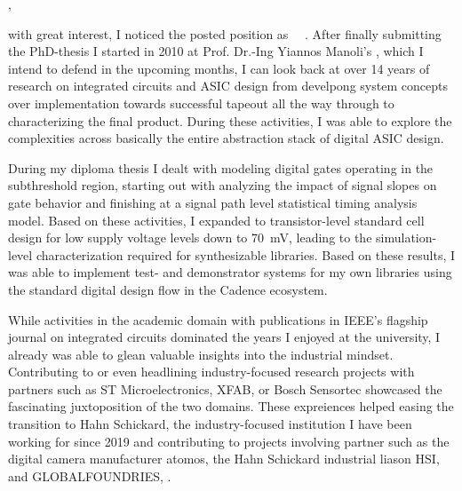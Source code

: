 



\recipient{\firma{}}{\adresse{}}
\opening{\anrede{},}
\date{\today}


\makelettertitle
\justifying


with great interest, I noticed the posted position as \stelleText~\firmaText~. After finally submitting the PhD-thesis I started in 2010 at Prof. Dr.-Ing Yiannos Manoli's \chair, which I intend to defend in the upcoming months, I can look back at over 14 years of research on integrated circuits and ASIC design from develpong system concepts over implementation towards successful tapeout all the way through to characterizing the final product. During these activities, I was able to explore the complexities across basically the entire abstraction stack of digital ASIC design.\par

During my diploma thesis I dealt with modeling digital gates operating in the subthreshold region, starting out with analyzing the impact of signal slopes on gate behavior and finishing at a signal path level statistical timing analysis model. Based on these activities, I expanded to transistor-level standard cell design for low supply voltage levels down to \SI{70}{\milli\volt}, leading to the simulation-level characterization required for synthesizable libraries. Based on these results, I was able to implement test- and demonstrator systems for my own libraries using the standard digital design flow in the Cadence ecosystem.\par

While activities in the academic domain with publications in IEEE's flagship journal on integrated circuits dominated the years I enjoyed at the university, I already was able to glean valuable insights into the industrial mindset. Contributing to or even headlining industry-focused research projects with partners such as ST Microelectronics, XFAB, or Bosch Sensortec showcased the fascinating juxtoposition of the two domains. These expreiences helped easing the transition to Hahn Schickard, the industry-focused institution I have been working for since 2019 and contributing to projects involving partner such as the digital camera manufacturer atomos, the Hahn Schickard industrial liason HSI, and GLOBALFOUNDRIES, .\par



